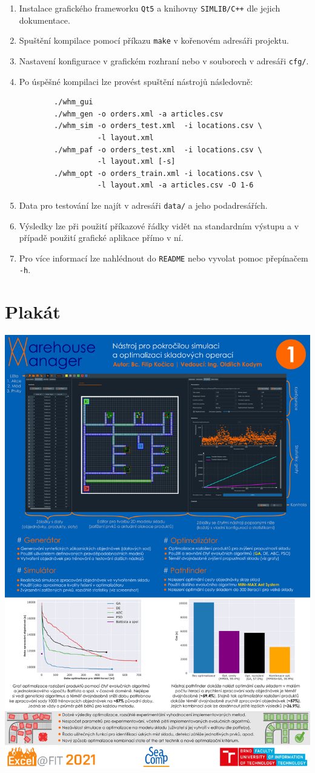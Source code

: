 \begin{enumerate}
    \item Instalace grafického frameworku \texttt{Qt5} a knihovny \texttt{SIMLIB/C++} dle jejich dokumentace.
    \item Spuštění kompilace pomocí příkazu \texttt{make} v kořenovém adresáři projektu.
    \item Nastavení konfigurace v grafickém rozhraní nebo v souborech v adresáři \texttt{cfg/}.
    \item Po úspěšné kompilaci lze provést spuštění nástrojů následovně:
    \begin{verbatim}
        ./whm_gui
        ./whm_gen -o orders.xml -a articles.csv
        ./whm_sim -o orders_test.xml  -i locations.csv \
                  -l layout.xml
        ./whm_paf -o orders_test.xml  -i locations.csv \
                  -l layout.xml [-s]
        ./whm_opt -o orders_train.xml -i locations.csv \
                  -l layout.xml -a articles.csv -O 1-6
    \end{verbatim}
    \item Data pro testování lze najít v adresáři \texttt{data/} a jeho podadresářích.
    \item Výsledky lze při použití příkazové řádky vidět na standardním výstupu a v případě použití grafické aplikace přímo v ní.
    \item Pro více informací lze nahlédnout do \texttt{README} nebo vyvolat pomoc přepínačem \texttt{-h}.
\end{enumerate}

\chapter{Plakát}
\begin{center}
    \includegraphics[width=0.75\linewidth]{figures/prilohy/poster.pdf}
\end{center}
